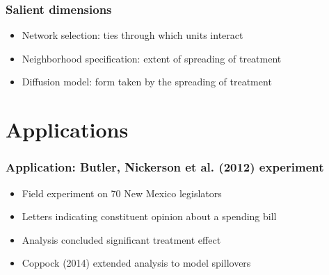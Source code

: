 \documentclass{beamer}
\begin{document}
\begin{frame}
\frametitle{Salient dimensions}
\begin{itemize}
\item {\LARGE Network selection: ties through which units interact}
\vspace{5mm}
\item {\LARGE Neighborhood specification: extent of spreading of treatment}
\vspace{5mm}
\item {\LARGE Diffusion model: form taken by the spreading of treatment}
\end{itemize}
\end{frame}



\section{Applications}

\begin{frame}
\frametitle{Application: Butler, Nickerson et al. (2012) experiment}
\begin{itemize}
\item {\LARGE Field experiment on 70 New Mexico legislators}
\vspace{5mm}
\item {\LARGE Letters indicating constituent opinion about a spending bill}
\vspace{5mm}
\item {\LARGE Analysis concluded significant treatment effect}
\vspace{5mm}
\item {\LARGE Coppock (2014) extended analysis to model spillovers}
\end{itemize}
\end{frame}
\end{document}
